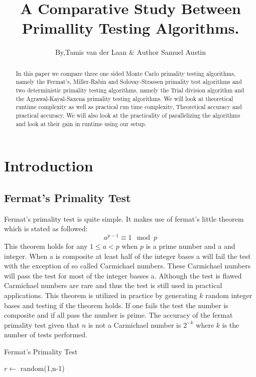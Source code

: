 \documentclass[compressed,final,notitlepage,narroweqnarray,inline,twoside,]{ieee}
\title[TITLE]{A Comparative Study Between Primallity Testing Algorithms.}
\author{By,Tamis van der Laan \& Author Samuel Austin }
\begin{document}
\maketitle

\begin{abstract}
In this paper we compare three one sided Monte Carlo primality testing algorithms, namely the Fermat’s, Miller-Rabin and Solovay-Strassen primality test algorithms and two deterministic primality testing algorithms, namely the Trial division algorithm and the Agrawal-Kayal-Saxena primality testing algorithms.  We will look at theoretical runtime complexity as well as practical run time complexity, Theoretical accuracy and practical accuracy. We will also look at the practicality of parallelizing the algorithms and look at their gain in runtime using our setup.
\end{abstract}
\section{Introduction}
\subsection{Fermat's Primality Test}
Fermat's primality test is quite simple. It makes use of fermat’s little theorem \cite{FLT} which is stated as followed:  
\begin{equation}
a^{p-1} \equiv  1 \mod p
\end{equation}
This theorem holds for any $1\leq a < p$ when $p$ is a prime number and a and integer. When a is composite at least half of the integer bases a will fail the test with the exception of so called Carmichael numbers. These Carmichael numbers will pass the test for most of the integer basses a. Although the test is flawed Carmichael numbers are rare and thus the test is still used in practical applications. This theorem is utilized in practice by generating $k$ random integer bases and testing if the theorem holds. If one fails the test the number is composite and if all pass the number is prime. The accuracy of the fermat primality test given that $n$ is not a Carmichael number is $2^{-k}$ where $k$ is the number of tests performed.
\begin{algorithm}[ht]
 \caption{Fermat's Primality Test}
 {
	$r \longleftarrow$ random(1,n-1) \;
	{
		\;
	}
 }
 \;
\end{algorithm}
\end{document}
